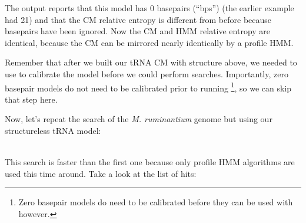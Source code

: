 The output reports that this model has 0 basepairs (``bps'') (the
earlier example had 21) and that the CM relative entropy is different
from before because basepairs have been ignored. Now the CM and HMM 
relative entropy are identical, because the CM can be mirrored nearly
identically by a profile HMM.

Remember that after we built our tRNA CM with structure above, we
needed to use  to calibrate the model before we
could perform searches. Importantly, zero basepair models do not need
to be calibrated prior to running \footnote{Zero
  basepair models do need to be calibrated before they can be used
  with  however.}, so we can skip that step here. 

Now, let's repeat the search of the \emph{M. ruminantium} genome but
using our structureless tRNA model: 

\\

This search is faster than the first one because only profile HMM
algorithms are used this time around. Take a look at the list of hits:

\newpage

